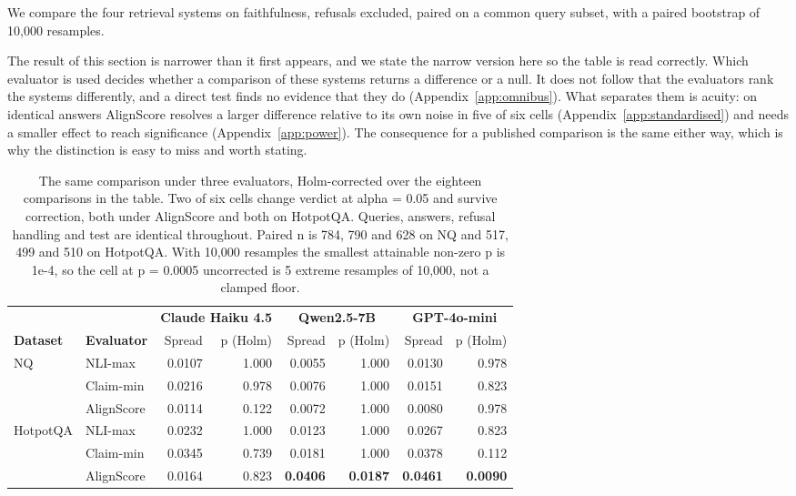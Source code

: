 \documentclass[11pt]{article}
\begin{document}
We compare the four retrieval systems on faithfulness, refusals excluded, paired on a common query subset, with a paired bootstrap of 10,000 resamples.

The result of this section is narrower than it first appears, and we state the narrow version here so the table is read correctly. Which evaluator is used decides whether a comparison of these systems returns a difference or a null. It does not follow that the evaluators rank the systems differently, and a direct test finds no evidence that they do (Appendix~\ref{app:omnibus}). What separates them is acuity: on identical answers AlignScore resolves a larger difference relative to its own noise in five of six cells (Appendix~\ref{app:standardised}) and needs a smaller effect to reach significance (Appendix~\ref{app:power}). The consequence for a published comparison is the same either way, which is why the distinction is easy to miss and worth stating.

\begin{table}[t]
\centering
\small
\begin{tabular}{llrrrrrr}
\toprule
 & & \multicolumn{2}{c}{\textbf{Claude Haiku 4.5}} & \multicolumn{2}{c}{\textbf{Qwen2.5-7B}} & \multicolumn{2}{c}{\textbf{GPT-4o-mini}} \\
\cmidrule(lr){3-4}\cmidrule(lr){5-6}\cmidrule(lr){7-8}
\textbf{Dataset} & \textbf{Evaluator} & Spread & p (Holm) & Spread & p (Holm) & Spread & p (Holm) \\
\midrule
NQ & NLI-max & 0.0107 & 1.000 & 0.0055 & 1.000 & 0.0130 & 0.978 \\
 & Claim-min & 0.0216 & 0.978 & 0.0076 & 1.000 & 0.0151 & 0.823 \\
 & AlignScore & 0.0114 & 0.122 & 0.0072 & 1.000 & 0.0080 & 0.978 \\
\midrule
HotpotQA & NLI-max & 0.0232 & 1.000 & 0.0123 & 1.000 & 0.0267 & 0.823 \\
 & Claim-min & 0.0345 & 0.739 & 0.0181 & 1.000 & 0.0378 & 0.112 \\
 & AlignScore & 0.0164 & 0.823 & \textbf{0.0406} & \textbf{0.0187} & \textbf{0.0461} & \textbf{0.0090} \\
\bottomrule
\end{tabular}
\caption{The same comparison under three evaluators, Holm-corrected over the eighteen comparisons in the table. Two of six cells change verdict at alpha = 0.05 and survive correction, both under AlignScore and both on HotpotQA. Queries, answers, refusal handling and test are identical throughout. Paired n is 784, 790 and 628 on NQ and 517, 499 and 510 on HotpotQA. With 10,000 resamples the smallest attainable non-zero p is 1e-4, so the cell at p = 0.0005 uncorrected is 5 extreme resamples of 10,000, not a clamped floor.}
\label{tab:7}
\end{table}
\end{document}
